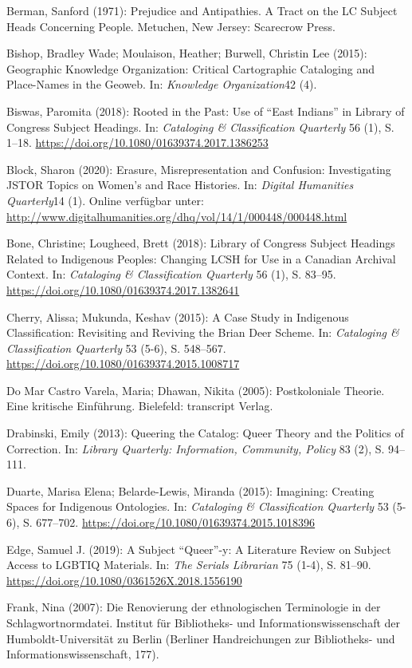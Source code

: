 \documentclass[a4paper,
fontsize=11pt,
oneside,
numbers=noperiodatend,
parskip=half-,
bibliography=totoc,
final
]{scrartcl}
\begin{document}
Berman, Sanford (1971): Prejudice and Antipathies. A Tract on the LC
Subject Heads Concerning People. Metuchen, New Jersey: Scarecrow Press.

Bishop, Bradley Wade; Moulaison, Heather; Burwell, Christin Lee (2015):
Geographic Knowledge Organization: Critical Cartographic Cataloging and
Place-Names in the Geoweb. In: \emph{Knowledge Organization}42 (4).

Biswas, Paromita (2018): Rooted in the Past: Use of \enquote{East
Indians} in Library of Congress Subject Headings. In: \emph{Cataloging
\& Classification Quarterly} 56 (1), S. 1--18.
\url{https://doi.org/10.1080/01639374.2017.1386253}

Block, Sharon (2020): Erasure, Misrepresentation and Confusion:
Investigating JSTOR Topics on Women's and Race Histories. In:
\emph{Digital Humanities Quarterly}14 (1). Online verfügbar unter:
\url{http://www.digitalhumanities.org/dhq/vol/14/1/000448/000448.html}

Bone, Christine; Lougheed, Brett (2018): Library of Congress Subject
Headings Related to Indigenous Peoples: Changing LCSH for Use in a
Canadian Archival Context. In: \emph{Cataloging \& Classification
Quarterly} 56 (1), S. 83--95.
\url{https://doi.org/10.1080/01639374.2017.1382641}

Cherry, Alissa; Mukunda, Keshav (2015): A Case Study in Indigenous
Classification: Revisiting and Reviving the Brian Deer Scheme. In:
\emph{Cataloging \& Classification Quarterly} 53 (5-6), S. 548--567.
\url{https://doi.org/10.1080/01639374.2015.1008717}

Do Mar Castro Varela, Maria; Dhawan, Nikita (2005): Postkoloniale
Theorie. Eine kritische Einführung. Bielefeld: transcript Verlag.

Drabinski, Emily (2013): Queering the Catalog: Queer Theory and the
Politics of Correction. In: \emph{Library Quarterly: Information,
Community, Policy} 83 (2), S. 94--111.

Duarte, Marisa Elena; Belarde-Lewis, Miranda (2015): Imagining: Creating
Spaces for Indigenous Ontologies. In: \emph{Cataloging \& Classification
Quarterly} 53 (5-6), S. 677--702.
\url{https://doi.org/10.1080/01639374.2015.1018396}

Edge, Samuel J. (2019): A Subject \enquote{Queer}-y: A Literature Review
on Subject Access to LGBTIQ Materials. In: \emph{The Serials Librarian}
75 (1-4), S. 81--90. \url{https://doi.org/10.1080/0361526X.2018.1556190}

Frank, Nina (2007): Die Renovierung der ethnologischen Terminologie in
der Schlagwortnormdatei. Institut für Bibliotheks- und
Informationswissenschaft der Humboldt-Universität zu Berlin (Berliner
Handreichungen zur Bibliotheks- und Informationswissenschaft, 177).
\end{document}
